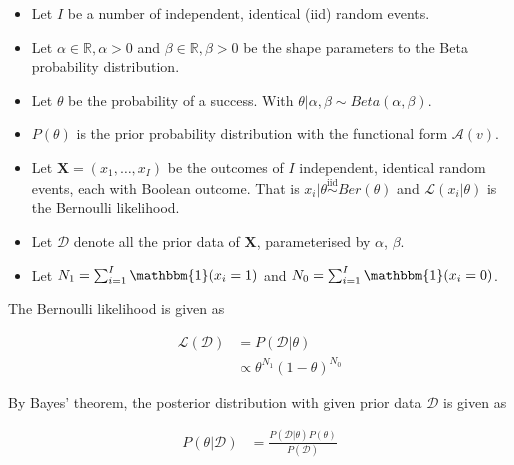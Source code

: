 \begin{itemize}
	\item Let $I$ be a number of independent, identical  (iid) random events.

	\item Let $\alpha \in \mathbb{R}, \alpha > 0$ and $\beta \in \mathbb{R}, \beta >0$ be the shape parameters to the Beta probability distribution.

	\item Let $\theta$ be the probability of a success. With $\theta | \alpha, \beta \sim Beta(\alpha, \beta)$.

	\item $P(\theta)$ is the prior probability distribution with the functional form $\mathcal{A}(v)$.

	\item Let $\boldsymbol{X} = (x_{1}, \dots, x_{I})$ be the outcomes of $I$ independent, identical random events, each with Boolean outcome. That is $x_{i} | \theta \overset{\text{iid}}{\sim} Ber(\theta)$ and $\mathcal{L}(x_{i} \vert \theta)$ is the Bernoulli likelihood.

	\item Let $\boldsymbol{\mathcal{D}}$ denote all the prior data of $\boldsymbol{X}$, parameterised by $\alpha$, $\beta$.

	\item Let $N_{1} = \sum_{i=1}^{I} \mathbbm{1}(x_{i} = 1)$ and $N_{0} = \sum_{i=1}^{I} \mathbbm{1}(x_{i} = 0)$.
\end{itemize}

The Bernoulli likelihood is given as

\begin{equation}
	\label{eq:probability:conjugate_priors:binom_likelihood:likelihood}
	\begin{split}
		\mathcal{L}(\boldsymbol{\mathcal{D}}) &=  P(\boldsymbol{\mathcal{D}} | \theta) \\
		&\propto \theta^{N_{1}}(1-\theta)^{N_{0}}
	\end{split}
\end{equation}

By Bayes' theorem, the posterior distribution with given prior data $\boldsymbol{\mathcal{D}}$ is given as

\begin{equation}
	\begin{split}
		\label{eq:probability:conjugate_priors:binom_likelihood:posterior}
		P(\theta \vert \boldsymbol{\mathcal{D}}) &= \frac{P(\boldsymbol{\mathcal{D}} | \theta) P(\theta)}{P(\boldsymbol{\mathcal{D}})}
	\end{split}
\end{equation}

